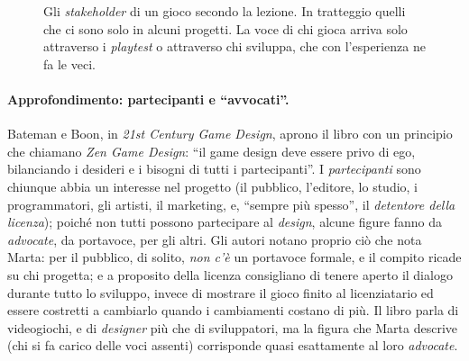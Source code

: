 \begin{figure}[htbp]
\centering
{}
\caption{Gli \emph{stakeholder} di un gioco secondo la lezione. In tratteggio quelli che
ci sono solo in alcuni progetti. La voce di chi gioca arriva solo attraverso i
\emph{playtest} o attraverso chi sviluppa, che con l'esperienza ne fa le veci.}
\label{a13:fig:stakeholder}
\end{figure}

\paragraph{Approfondimento: partecipanti e ``avvocati''.} Bateman e Boon, in \emph{21st
Century Game Design}, aprono il libro con un principio che chiamano \emph{Zen Game
Design}: ``il game design deve essere privo di ego, bilanciando i desideri e i bisogni di
tutti i partecipanti''. I \emph{partecipanti} sono chiunque abbia un interesse nel
progetto (il pubblico, l'editore, lo studio, i programmatori, gli artisti, il marketing,
e, ``sempre più spesso'', il \emph{detentore della licenza}); poiché non tutti possono
partecipare al \emph{design}, alcune figure fanno da \emph{advocate}, da portavoce, per
gli altri. Gli autori notano proprio ciò che nota Marta: per il pubblico, di solito,
\emph{non c'è} un portavoce formale, e il compito ricade su chi progetta; e a proposito
della licenza consigliano di tenere aperto il dialogo durante tutto lo sviluppo, invece di
mostrare il gioco finito al licenziatario ed essere costretti a cambiarlo quando i
cambiamenti costano di più. Il libro parla di videogiochi, e di \emph{designer} più che
di sviluppatori, ma la figura che Marta descrive (chi si fa carico delle voci assenti)
corrisponde quasi esattamente al loro \emph{advocate}.


